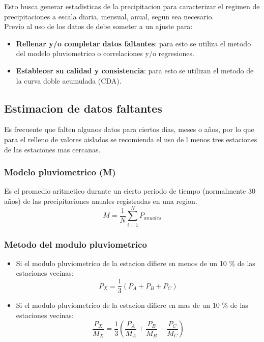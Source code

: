 Esto busca generar estadisticas de la precipitacion para caracterizar el regimen de precipitaciones a escala diaria, mensual, anual, segun sea necesario.\\
Previo al uso de los datos de debe someter a un ajuste para: 

\begin{itemize}
    \item \textbf{Rellenar y/o completar datos faltantes}: para esto se utiliza el metodo del modelo pluviometrico o correlaciones y/o regresiones.
    \item \textbf{Establecer su calidad y consistencia}: para esto se utilizan el metodo de la curva doble acumulada (CDA).
\end{itemize}

\subsection{Estimacion de datos faltantes}

Es frecuente que falten algunos datos para ciertos dias, meses o años, por lo que para el relleno de valores aislados se recomienda el uso de l menos tres estaciones de las estaciones mas cercanas.

\subsubsection{Modelo pluviometrico (M)}

Es el promedio aritmetico durante un cierto periodo de tiempo (normalmente 30 años) de las precipitaciones anuales registradas en una region.\\

\begin{equation}
    M = \frac{1}{N} \sum_{i=1}^{N} P_{anuales}
\end{equation}

\subsubsection{Metodo del modulo pluviometrico}

\begin{itemize}
    \item Si el modulo pluviometrico de la estacion difiere en menos de un 10 \% de las estaciones vecinas: \\
    \begin{equation}
        P_X = \frac{1}{3}(P_A + P_B + P_C)
    \end{equation}
    \item Si el modulo pluviometrico de la estacion difiere en mas de un 10 \% de las estaciones vecinas: \\
    \begin{equation}
        \frac{P_X}{M_X} = \frac{1}{3}(\frac{P_A}{M_A} + \frac{P_B}{M_B} + \frac{P_C}{M_C})
    \end{equation}
\end{itemize}

